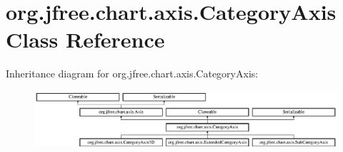 \hypertarget{classorg_1_1jfree_1_1chart_1_1axis_1_1_category_axis}{}\section{org.\+jfree.\+chart.\+axis.\+Category\+Axis Class Reference}
\label{classorg_1_1jfree_1_1chart_1_1axis_1_1_category_axis}
Inheritance diagram for org.\+jfree.\+chart.\+axis.\+Category\+Axis\+:\begin{figure}[H]
\begin{center}
\leavevmode
\includegraphics[height=2.153846cm]{classorg_1_1jfree_1_1chart_1_1axis_1_1_category_axis}
\end{center}
\end{figure}
